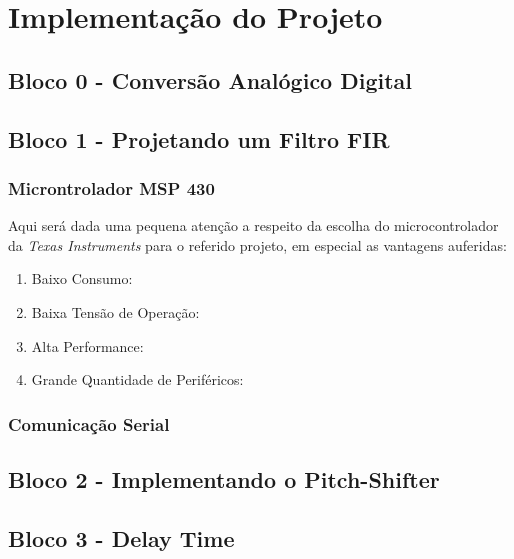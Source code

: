 \chapter{Implementação do Projeto}

\section{Bloco 0 - Conversão Analógico Digital}

\section{Bloco 1 - Projetando um Filtro FIR}
	\subsection{Microntrolador MSP 430}
		Aqui será dada uma pequena atenção a respeito da escolha do microcontrolador da \textit{Texas Instruments} para o referido projeto, em especial as vantagens auferidas:
		
		\begin{enumerate}
			\item Baixo Consumo:
			\item Baixa Tensão de Operação:
			\item Alta Performance:
			\item Grande Quantidade de Periféricos:
		\end{enumerate}
	\subsection{Comunicação Serial}
		

\section{Bloco 2 - Implementando o Pitch-Shifter}

\section{Bloco 3 - Delay Time}